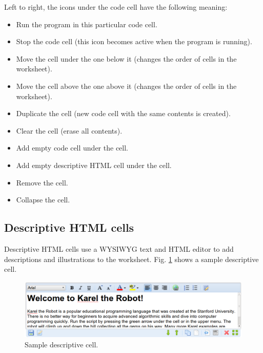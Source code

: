 \noindent
Left to right, the icons under the code cell have the following meaning: 
\begin{itemize}
\item Run the program in this particular code cell.
\item Stop the code cell (this icon becomes active when the program is running).
\item Move the cell under the one below it (changes the order of cells in the worksheet).
\item Move the cell above the one above it (changes the order of cells in the worksheet).
\item Duplicate the cell (new code cell with the same contents is created).
\item Clear the cell (erase all contents).
\item Add empty code cell under the cell.
\item Add empty descriptive HTML cell under the cell.
\item Remove the cell.
\item Collapse the cell. 
\end{itemize}

\subsection{Descriptive HTML cells}

Descriptive HTML cells use a WYSIWYG text and HTML editor 
to add descriptions and illustrations to the worksheet. Fig. 
\ref{fig:menu-112} shows a sample descriptive cell.

\begin{figure}[!ht]
\begin{center}
\includegraphics[width=16cm]{img/menu-113.png}
\vspace{-0mm}
\caption{Sample descriptive cell.}
\label{fig:menu-112}
\end{center}
\end{figure}
\noindent

